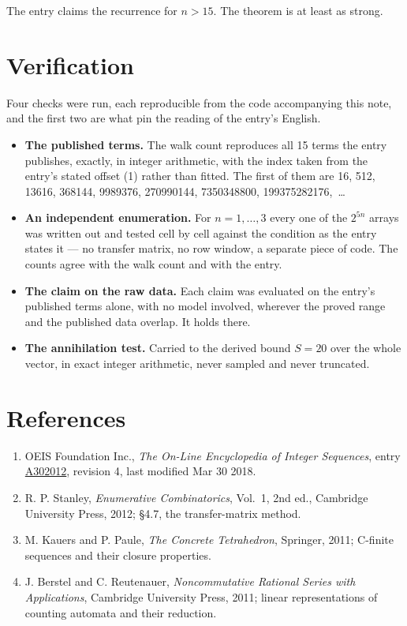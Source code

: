 \documentclass[11pt]{article}
\theoremstyle{definition}
\begin{document}
The entry claims the recurrence for $n > 15$. The theorem is at least as strong.

\section{Verification}

Four checks were run, each reproducible from the code accompanying this note, and the first two are what pin the reading of the entry's English.

\begin{itemize}

\item {\bfseries The published terms.} The walk count reproduces all 15 terms the entry publishes, exactly, in integer arithmetic, with the index taken from the entry's stated offset (1) rather than fitted. The first of them are 16, 512, 13616, 368144, 9989376, 270990144, 7350348800, 199375282176,~\dots

\item {\bfseries An independent enumeration.} For $n = 1,\dots,3$ every one of the $2^{5n}$ arrays was written out and tested cell by cell against the condition as the entry states it --- no transfer matrix, no row window, a separate piece of code. The counts agree with the walk count and with the entry.

\item {\bfseries The claim on the raw data.} Each claim was evaluated on the entry's published terms alone, with no model involved, wherever the proved range and the published data overlap. It holds there.

\item {\bfseries The annihilation test.} Carried to the derived bound $S = 20$ over the whole vector, in exact integer arithmetic, never sampled and never truncated.

\end{itemize}

\section{References}

\begin{enumerate}

\item OEIS Foundation Inc., \emph{The On-Line Encyclopedia of Integer Sequences}, entry \href{https://oeis.org/A302012}{A302012}, revision 4, last modified Mar 30 2018.

\item R. P. Stanley, \emph{Enumerative Combinatorics}, Vol.~1, 2nd ed., Cambridge University Press, 2012; \S4.7, the transfer-matrix method.

\item M. Kauers and P. Paule, \emph{The Concrete Tetrahedron}, Springer, 2011; C-finite sequences and their closure properties.

\item J. Berstel and C. Reutenauer, \emph{Noncommutative Rational Series with Applications}, Cambridge University Press, 2011; linear representations of counting automata and their reduction.

\end{enumerate}
\end{document}
